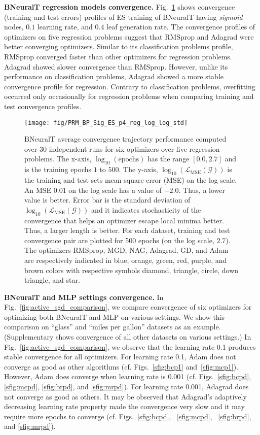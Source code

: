 \documentclass[11pt,a4paper]{article}
\begin{document}
    \textbf{BNeuralT regression models convergence.} Fig.~\ref{fig:BneuralT_reg_all} shows convergence (training and test errors) profiles of ES training of BNeuralT having \textit{sigmoid} nodes, $0.1$ learning rate, and $0.4$ leaf generation rate.  The convergence profiles of optimizers on five regression problems suggest that RMSprop and Adagrad were better converging optimizers. Similar to its classification problems profile, RMSprop converged faster than other optimizers for regression problems. Adagrad showed slower convergence than RMSprop. However, unlike its performance on classification problems, Adagrad showed a more stable convergence profile for regression. Contrary to classification problems, overfitting occurred only occasionally for  regression problems when comparing training and test convergence profiles.
\begin{figure}
        \centering
\texttt{[image: fig/PRM\_BP\_Sig\_ES\_p4\_reg\_log\_log\_std]}
        \caption{BNeuralT average convergence trajectory performance computed over 30 independent runs for six optimizers over five regression problems. The x-axis, $\log_{10}(\mbox{epochs})$ has the range $[0.0, 2.7]$ and is the training epochs $1$ to $500$. The y-axis, $\log_{10}(\mathcal{L}_{\mbox{MSE}}(\mathcal{G}))$ is the training and test sets mean square error (MSE) on the log scale. An MSE $0.01$ on the log scale has a value of $-2.0$. Thus, a lower value is better. Error bar is the standard deviation of $\log_{10}(\mathcal{L}_{\text{MSE}}(\mathcal{G}))$ and it indicates stochasticity of the convergence that helps an optimizer escape local minima better. Thus, a larger length is better. For each dataset, training and test convergence pair are plotted for 500 epochs (on the log scale, $2.7$). The optimizers RMSprop, MGD, NAG, Adagrad, GD, and Adam are respectively indicated in blue, orange, green, red, purple, and brown colors with respective symbols diamond, triangle, circle, down triangle, and star.}\label{fig:BneuralT_reg_all}
    \end{figure} 
    
    \textbf{BNeuralT and MLP settings convergence.}
    In Fig.~\ref{fig:active_sgd_comparison}, we compare convergence of six optimizers for optimizing both BNeuralT and MLP on various settings. We show this comparison on ``glass'' and ``miles per gallon'' datasets as an example. (Supplementary shows convergence of all other datasets on various settings.) In Fig.~\ref{fig:active_sgd_comparison}, we observe that the learning rate 0.1 produces stable convergence for all optimizers. For learning rate 0.1, Adam does not converge as good as other algorithms (cf. Figs.~\ref{sfig:bcp1} and~\ref{sfig:mcp1}). However, Adam does converge when learning rate is 0.001 (cf. Figs.~\ref{sfig:bcpd}, \ref{sfig:mcpd}, \ref{sfig:brpd}, and \ref{sfig:mrpd}). For learning rate 0.001, Adagrad does not converge as good as others. It may be observed that Adagrad's adaptively decreasing learning rate property made the convergence very slow and it may require more epochs to converge (cf. Figs.~\ref{sfig:bcpd}, ~\ref{sfig:mcpd}, ~\ref{sfig:brpd}, and \ref{sfig:mrpd}). 
    
\end{document}
